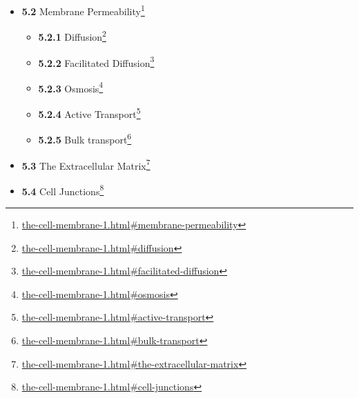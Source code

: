 \documentclass[
]{article}
\providecommand{\tightlist}{%
  \setlength{\itemsep}{0pt}\setlength{\parskip}{0pt}}
\providecommand{\tightlist}{%
  \setlength{\itemsep}{0pt}\setlength{\parskip}{0pt}}
\let\rmarkdownfootnote\footnote%
\def\footnote{\protect\rmarkdownfootnote}
\renewcommand{\href}[2]{#2\footnote{\url{#1}}}
\theoremstyle{definition}
\theoremstyle{definition}
\theoremstyle{definition}
\theoremstyle{remark}
\begin{document}
\begin{itemize}
\begin{itemize}
    \begin{itemize}
    \tightlist
    \item
      \href{the-cell-membrane-1.html\#the-fluid-mosaic-model-of-the-cell-membrane}{\emph{}\textbf{5.1.1}
      The Fluid Mosaic Model of The Cell Membrane}
    \item
      \href{the-cell-membrane-1.html\#lipid-bilayer}{\emph{}\textbf{5.1.2}
      Lipid bilayer}
    \item
      \href{the-cell-membrane-1.html\#membrane-polarity}{\emph{}\textbf{5.1.3}
      Membrane Polarity}
    \item
      \href{the-cell-membrane-1.html\#the-cytoskeleton-1}{\emph{}\textbf{5.1.4}
      The Cytoskeleton}
    \item
      \href{the-cell-membrane-1.html\#intracellular-membranes-in-eukaryotic-cells}{\emph{}\textbf{5.1.5}
      Intracellular Membranes In Eukaryotic Cells}
    \end{itemize}
  \item
    \href{the-cell-membrane-1.html\#membrane-permeability}{\emph{}\textbf{5.2}
    Membrane Permeability}

    \begin{itemize}
    \tightlist
    \item
      \href{the-cell-membrane-1.html\#diffusion}{\emph{}\textbf{5.2.1}
      Diffusion}
    \item
      \href{the-cell-membrane-1.html\#facilitated-diffusion}{\emph{}\textbf{5.2.2}
      Facilitated Diffusion}
    \item
      \href{the-cell-membrane-1.html\#osmosis}{\emph{}\textbf{5.2.3}
      Osmosis}
    \item
      \href{the-cell-membrane-1.html\#active-transport}{\emph{}\textbf{5.2.4}
      Active Transport}
    \item
      \href{the-cell-membrane-1.html\#bulk-transport}{\emph{}\textbf{5.2.5}
      Bulk transport}
    \end{itemize}
  \item
    \href{the-cell-membrane-1.html\#the-extracellular-matrix}{\emph{}\textbf{5.3}
    The Extracellular Matrix}
  \item
    \href{the-cell-membrane-1.html\#cell-junctions}{\emph{}\textbf{5.4}
    Cell Junctions}


\end{itemize}
\end{itemize}
\end{document}
